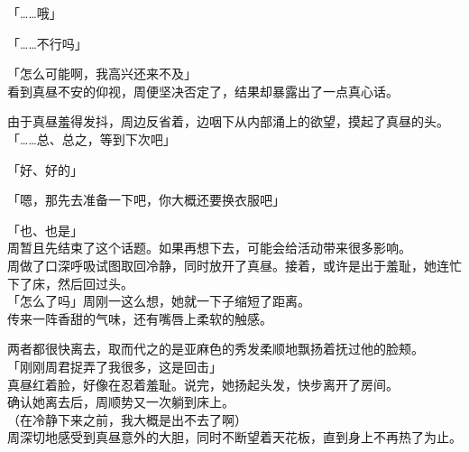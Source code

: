 「……哦」

「……不行吗」

「怎么可能啊，我高兴还来不及」\\

看到真昼不安的仰视，周便坚决否定了，结果却暴露出了一点真心话。

由于真昼羞得发抖，周边反省着，边咽下从内部涌上的欲望，摸起了真昼的头。\\

「……总、总之，等到下次吧」

「好、好的」

「嗯，那先去准备一下吧，你大概还要换衣服吧」

「也、也是」\\

周暂且先结束了这个话题。如果再想下去，可能会给活动带来很多影响。\\

周做了口深呼吸试图取回冷静，同时放开了真昼。接着，或许是出于羞耻，她连忙下了床，然后回过头。\\

「怎么了吗」周刚一这么想，她就一下子缩短了距离。\\

传来一阵香甜的气味，还有嘴唇上柔软的触感。

两者都很快离去，取而代之的是亚麻色的秀发柔顺地飘扬着抚过他的脸颊。\\

「刚刚周君捉弄了我很多，这是回击」\\

真昼红着脸，好像在忍着羞耻。说完，她扬起头发，快步离开了房间。\\

确认她离去后，周顺势又一次躺到床上。\\

（在冷静下来之前，我大概是出不去了啊）\\

周深切地感受到真昼意外的大胆，同时不断望着天花板，直到身上不再热了为止。
